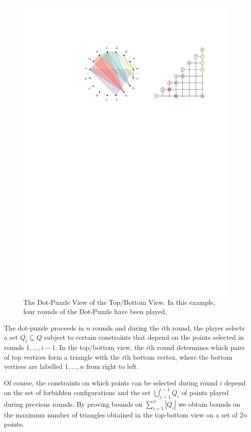 \documentclass{patmorin}
\begin{document}
\begin{figure}
   \begin{center}
      \includegraphics{figs/point-view}
   \end{center}
   \caption{The Dot-Puzzle View of the Top/Bottom View. In this example,
     four rounds of the Dot-Puzzle have been played.}
\end{figure}

The dot-puzzle proceeds in $n$ rounds and during the $i$th round, the
player selects a set $Q_i\subseteq Q$ subject to certain constraints
that depend on the points selected in rounds $1,\ldots,i-1$.  In the
top/bottom view, the $i$th round determines which pairs of top vertices
form a triangle with the $i$th bottom vertex, where the bottom
vertices are labelled $1,\ldots,n$ from right to left.  

Of course, the constraints on which points can be selected during
round $i$ depend on the set of forbidden configurations and the set
$\bigcup_{j=1}^{i-1} Q_i$ of points played during previous rounds.
By proving bounds on $\sum_{i=1}^n |Q_i|$ we obtain bounds on the maximum
number of triangles obtained in the top-bottom view on a set of $2n$
points.
\end{document}
